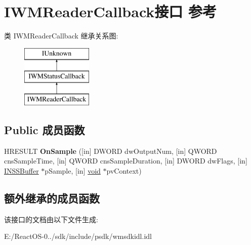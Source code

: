 \hypertarget{interface_i_w_m_reader_callback}{}\section{I\+W\+M\+Reader\+Callback接口 参考}
\label{interface_i_w_m_reader_callback}
类 I\+W\+M\+Reader\+Callback 继承关系图\+:\begin{figure}[H]
\begin{center}
\leavevmode
\includegraphics[height=3.000000cm]{interface_i_w_m_reader_callback}
\end{center}
\end{figure}
\subsection*{Public 成员函数}
\begin{DoxyCompactItemize}
\item 
\mbox{\label{interface_i_w_m_reader_callback_a5b412ce9f60378595f511dc10a3b2f1f}} 
H\+R\+E\+S\+U\+LT {\bfseries On\+Sample} (\mbox{[}in\mbox{]} D\+W\+O\+RD dw\+Output\+Num, \mbox{[}in\mbox{]} Q\+W\+O\+RD cns\+Sample\+Time, \mbox{[}in\mbox{]} Q\+W\+O\+RD cns\+Sample\+Duration, \mbox{[}in\mbox{]} D\+W\+O\+RD dw\+Flags, \mbox{[}in\mbox{]} \hyperlink{interface_i_n_s_s_buffer}{I\+N\+S\+S\+Buffer} $\ast$p\+Sample, \mbox{[}in\mbox{]} \hyperlink{interfacevoid}{void} $\ast$pv\+Context)
\end{DoxyCompactItemize}
\subsection*{额外继承的成员函数}


该接口的文档由以下文件生成\+:\begin{DoxyCompactItemize}
\item 
E\+:/\+React\+O\+S-\/0../sdk/include/psdk/wmsdkidl.\+idl\end{DoxyCompactItemize}
